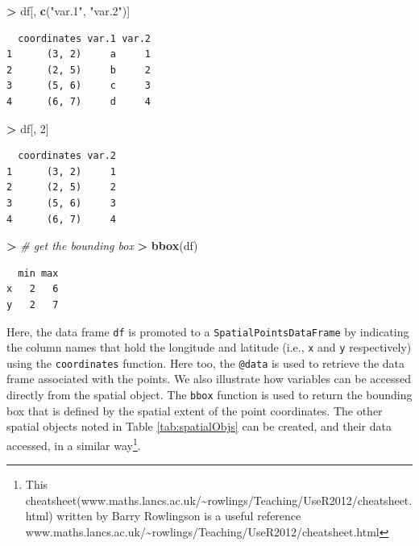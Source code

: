 \documentclass[]{krantz}
\makeatletter
\newenvironment{Shaded}{\begin{snugshade}}{\end{snugshade}}
\newcommand{\KeywordTok}[1]{\textcolor[rgb]{0.27,0.27,0.27}{\textbf{#1}}}
\newcommand{\DecValTok}[1]{\textcolor[rgb]{0.06,0.06,0.06}{#1}}
\newcommand{\StringTok}[1]{\textcolor[rgb]{0.5,0.5,0.5}{#1}}
\newcommand{\CommentTok}[1]{\textcolor[rgb]{0.37,0.37,0.37}{\textit{#1}}}
\newcommand{\OperatorTok}[1]{\textcolor[rgb]{0.43,0.43,0.43}{\textbf{#1}}}
\newcommand{\ErrorTok}[1]{\textcolor[rgb]{0.14,0.14,0.14}{\textbf{#1}}}
\newcommand{\NormalTok}[1]{#1}
\newenvironment{kframe}{%
\medskip{}
\setlength{\fboxsep}{.8em}
 \def\at@end@of@kframe{}%
 \ifinner\ifhmode%
  \def\at@end@of@kframe{\end{minipage}}%
  \begin{minipage}{\columnwidth}%
 \fi\fi%
 \def\FrameCommand##1{\hskip\@totalleftmargin \hskip-\fboxsep
 \colorbox{shadecolor}{##1}\hskip-\fboxsep
     \hskip-\linewidth \hskip-\@totalleftmargin \hskip\columnwidth}%
 \MakeFramed {\advance\hsize-\width
   \@totalleftmargin\z@ \linewidth\hsize
   \@setminipage}}%
 {\par\unskip\endMakeFramed%
 \at@end@of@kframe}
\renewenvironment{Shaded}{\begin{kframe}}{\end{kframe}}
\theoremstyle{definition}
\theoremstyle{definition}
\theoremstyle{definition}
\theoremstyle{remark}
\makeatother
\begin{document}
\begin{Shaded}
\begin{Highlighting}[]
\OperatorTok{>}\StringTok{ }\NormalTok{df[, }\KeywordTok{c}\NormalTok{(}\StringTok{"var.1"}\NormalTok{, }\StringTok{"var.2"}\NormalTok{)]}
\end{Highlighting}
\end{Shaded}

\begin{verbatim}
  coordinates var.1 var.2
1      (3, 2)     a     1
2      (2, 5)     b     2
3      (5, 6)     c     3
4      (6, 7)     d     4
\end{verbatim}

\begin{Shaded}
\begin{Highlighting}[]
\OperatorTok{>}\StringTok{ }\NormalTok{df[, }\DecValTok{2}\NormalTok{]}
\end{Highlighting}
\end{Shaded}

\begin{verbatim}
  coordinates var.2
1      (3, 2)     1
2      (2, 5)     2
3      (5, 6)     3
4      (6, 7)     4
\end{verbatim}

\begin{Shaded}
\begin{Highlighting}[]
\OperatorTok{>}\StringTok{ }\CommentTok{# get the bounding box}
\ErrorTok{>}\StringTok{ }\KeywordTok{bbox}\NormalTok{(df)}
\end{Highlighting}
\end{Shaded}

\begin{verbatim}
  min max
x   2   6
y   2   7
\end{verbatim}

Here, the data frame \texttt{df} is promoted to a
\texttt{SpatialPointsDataFrame} by indicating the column names that hold
the longitude and latitude (i.e., \texttt{x} and \texttt{y}
respectively) using the \texttt{coordinates} function. Here too, the
\texttt{@data} is used to retrieve the data frame associated with the
points. We also illustrate how variables can be accessed directly from
the spatial object. The \texttt{bbox} function is used to return the
bounding box that is defined by the spatial extent of the point
coordinates. The other spatial objects noted in Table
\ref{tab:spatialObjs} can be created, and their data accessed, in a
similar way\footnote{This
  cheatsheet(www.maths.lancs.ac.uk/\textasciitilde{}rowlings/Teaching/UseR2012/cheatsheet.html)
  written by Barry Rowlingson is a useful reference
  www.maths.lancs.ac.uk/\textasciitilde{}rowlings/Teaching/UseR2012/cheatsheet.html}.
\end{document}
